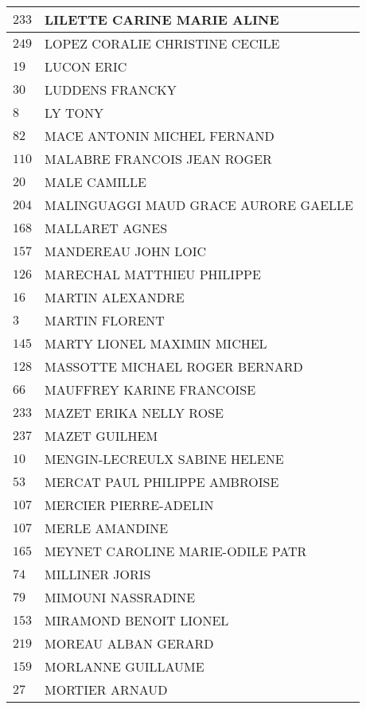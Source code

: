 \begin{xltabular}{\linewidth}{|l|X|}
    \hline
    $233$ & LILETTE CARINE MARIE ALINE \\
    \hline
    $249$ & LOPEZ CORALIE CHRISTINE CECILE \\
    \hline
    $19$ & LUCON ERIC \\
    \hline
    $30$ & LUDDENS FRANCKY \\
    \hline
    $8$ & LY TONY \\
    \hline
    $82$ & MACE ANTONIN MICHEL FERNAND \\
    \hline
    $110$ & MALABRE FRANCOIS JEAN ROGER \\
    \hline
    $20$ & MALE CAMILLE \\
    \hline
    $204$ & MALINGUAGGI MAUD GRACE AURORE GAELLE \\
    \hline
    $168$ & MALLARET AGNES \\
    \hline
    $157$ & MANDEREAU JOHN LOIC \\
    \hline
    $126$ & MARECHAL MATTHIEU PHILIPPE \\
    \hline
    $16$ & MARTIN ALEXANDRE \\
    \hline
    $3$ & MARTIN FLORENT \\
    \hline
    $145$ & MARTY LIONEL MAXIMIN MICHEL \\
    \hline
    $128$ & MASSOTTE MICHAEL ROGER BERNARD \\
    \hline
    $66$ & MAUFFREY KARINE FRANCOISE \\
    \hline
    $233$ & MAZET ERIKA NELLY ROSE \\
    \hline
    $237$ & MAZET GUILHEM \\
    \hline
    $10$ & MENGIN-LECREULX SABINE HELENE \\
    \hline
    $53$ & MERCAT PAUL PHILIPPE AMBROISE \\
    \hline
    $107$ & MERCIER PIERRE-ADELIN \\
    \hline
    $107$ & MERLE AMANDINE \\
    \hline
    $165$ & MEYNET CAROLINE MARIE-ODILE PATR \\
    \hline
    $74$ & MILLINER JORIS \\
    \hline
    $79$ & MIMOUNI NASSRADINE \\
    \hline
    $153$ & MIRAMOND BENOIT LIONEL \\
    \hline
    $219$ & MOREAU ALBAN GERARD \\
    \hline
    $159$ & MORLANNE GUILLAUME \\
    \hline
    $27$ & MORTIER ARNAUD \\

\end{xltabular}
